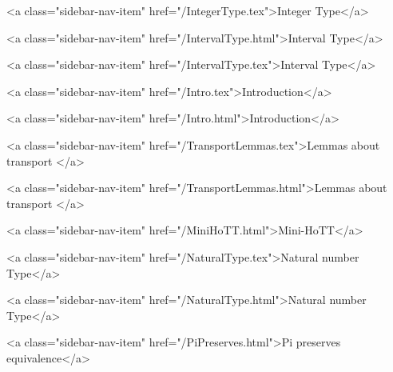           <a class="sidebar-nav-item" href="/IntegerType.tex">Integer Type</a>
        
      
    
      
        
          <a class="sidebar-nav-item" href="/IntervalType.html">Interval Type</a>
        
      
    
      
        
          <a class="sidebar-nav-item" href="/IntervalType.tex">Interval Type</a>
        
      
    
      
        
          <a class="sidebar-nav-item" href="/Intro.tex">Introduction</a>
        
      
    
      
        
          <a class="sidebar-nav-item" href="/Intro.html">Introduction</a>
        
      
    
      
        
          <a class="sidebar-nav-item" href="/TransportLemmas.tex">Lemmas about transport </a>
        
      
    
      
        
          <a class="sidebar-nav-item" href="/TransportLemmas.html">Lemmas about transport </a>
        
      
    
      
        
          <a class="sidebar-nav-item" href="/MiniHoTT.html">Mini-HoTT</a>
        
      
    
      
        
          <a class="sidebar-nav-item" href="/NaturalType.tex">Natural number Type</a>
        
      
    
      
        
          <a class="sidebar-nav-item" href="/NaturalType.html">Natural number Type</a>
        
      
    
      
        
          <a class="sidebar-nav-item" href="/PiPreserves.html">Pi preserves equivalence</a>
        
      
    
      
        
